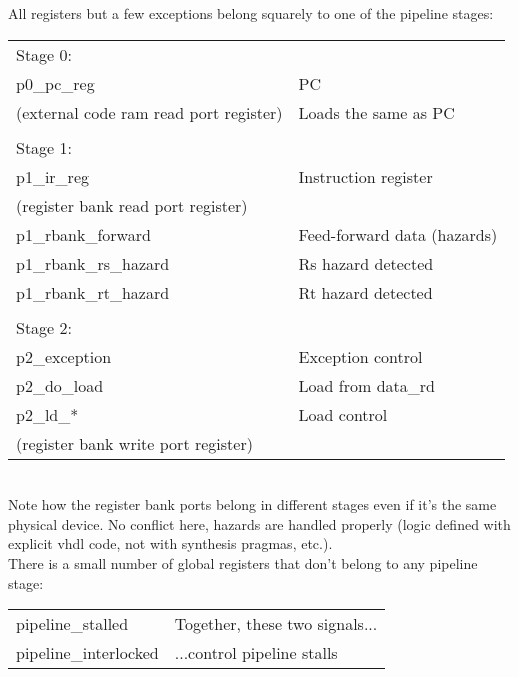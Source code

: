 \documentclass[11pt]{article}
\begin{document}
    All registers but a few exceptions belong squarely to one of the pipeline
    stages:\\
    
    \begin{tabular}{ l l }
    Stage 0:                                & \\
    p0\_pc\_reg                               & PC \\
    (external code ram read port register)  & Loads the same as PC \\
                                            & \\
    Stage 1:                                & \\
    p1\_ir\_reg                               & Instruction register \\
    (register bank read port register)      &  \\
    p1\_rbank\_forward                        & Feed-forward data (hazards) \\
    p1\_rbank\_rs\_hazard                      & Rs hazard detected \\
    p1\_rbank\_rt\_hazard                      & Rt hazard detected \\
                                            & \\
    Stage 2:                                & \\
    p2\_exception                            & Exception control \\
    p2\_do\_load                              & Load from data\_rd \\
    p2\_ld\_*                                 & Load control\\
    (register bank write port register)     & \\
    \end{tabular}\\  
    
    Note how the register bank ports belong in different stages even if it's
    the same physical device. No conflict here, hazards are handled properly
    (logic defined with explicit vhdl code, not with synthesis pragmas, etc.).\\

    There is a small number of global registers that don't belong to any 
    pipeline stage:\\
    
    \begin{tabular}{ p{4cm} l }
    pipeline\_stalled                        & Together, these two signals...\\
    pipeline\_interlocked                    & ...control pipeline stalls
    \end{tabular}\\
    
\end{document}

